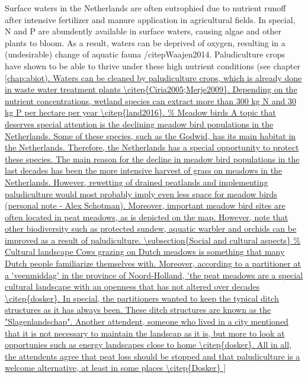 \documentclass[a4paper,12pt]{scrbook}
\begin{document}
Surface waters in the Netherlands are often eutrophied due to nutrient runoff after intensive fertilizer and manure application in agricultural fields. In special, N and P are abundently available in surface waters, causing algae and other plants to bloom. As a result, waters can be deprived of oxygen, resulting in a (undesirable) change of aquatic fauna /citep{Waajen2014}. Paludiculture crops have shown to be able to thrive under these high nutrient conditions (see chapter \ref{chap:abiot). Waters can be cleaned by paludiculture crops, which is already done in waste water treatment plants \citep{Ciria2005;Merje2009}. Depending on the nutrient concentrations, wetland species can extract more than 300 kg N and 30 kg P per hectare per year \citep{land2016}. 

A topic that deserves special attention is the declining meadow bird populations in the Netherlands. Some of these species, such as the Godwid, has its main habitat in the Netherlands. Therefore, the Netherlands has a special opportunity to protect these species. The main reason for the decline in meadow bird populations in the last decades has been the more intensive harvest of grass on meadows in the Netherlands. However, rewetting of drained peatlands and implementing paludiculture would most probably imply even less space for meadow birds (personal note - Alex Schotman). Moreover, important meadow bird sites are often located in peat meadows, as is depicted on the map. However, note that other biodiversity such as protected sundew, aquatic warbler and orchids can be improved as a result of paludiculture.

\subsection{Social and cultural aspects}
Cows grazing on Dutch meadows is something that many Dutch people familiarize themselves with. Moreover, according to a partitioner at a 'veenmiddag' in the province of Noord-Holland, 'the peat meadows are a special cultural landscape with an openness that has not altered over decades \citep{dosker}. In special, the partitioners wanted to keep the typical ditch structures as it has always been. These ditch structures are known as the "Slagenlandschap". Another attendent, someone who lived in a city mentioned that it is not necessary to maintain the landscap as it is, but more to look at opportunies such as energy landscapes close to home \citep{dosker}. All in all, the attendents agree that peat loss should be stopped and that paludiculture is a welcome alternative, at least in some places \citep{Dosker}

}
\end{document}
